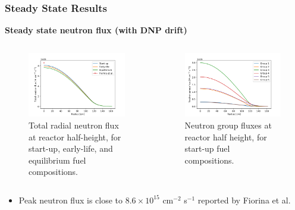 \begin{frame}
	\frametitle{Steady State Results}
		\textbf{Steady state neutron flux (with \gls{DNP} drift)}
		\begin{columns}
			\column[t]{5.5cm}
			\begin{figure}
				\small
				\centering
				\includegraphics[width=\textwidth]{./images/totalflux}
				\caption{Total radial neutron flux at reactor
				half-height, for start-up, early-life, and equilibrium fuel
				compositions.}
				\label{fig:totalflux}
			\end{figure}
			\column[t]{5.5cm}
			\begin{figure}
				\small
				\centering
				\includegraphics[width=\textwidth]{./images/stflux}
				\caption{Neutron group fluxes at reactor half
				height, for start-up fuel compositions.}
				\label{fig:stflux}
			\end{figure}
		\end{columns}
		\begin{itemize}
			\item Peak neutron flux is close to $8.6 \times 10^{15}$ cm$^{-2}$
			s$^{-1}$ reported by Fiorina et al.
			\cite{fiorina_investigation_2013}
		\end{itemize}
\end{frame}


